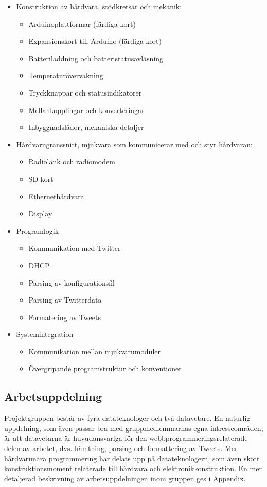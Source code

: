\documentclass[a4paper,11pt]{article}
\begin{document}
	\begin{itemize}
	\item Konstruktion av hårdvara, stödkretsar och mekanik:
		\begin{itemize}
        	\item Arduinoplattformar (färdiga kort)
        	\item Expansionskort till Arduino (färdiga kort)
        	\item Batteriladdning och batteristatusavläsning
        	\item Temperaturövervakning
        	\item Tryckknappar och statusindikatorer
        	\item Mellankopplingar och konverteringar
        	\item Inbyggnadslådor, mekaniska detaljer
        	\end{itemize}	
    	\item Hårdvarugränssnitt, mjukvara som kommunicerar med och styr hårdvaran:
    		\begin{itemize}
        	\item Radiolänk och radiomodem
        	\item SD-kort
        	\item Ethernethårdvara
        	\item Display
        	\end{itemize}
    	\item Programlogik
    		\begin{itemize}
        	\item Kommunikation med Twitter
        	\item DHCP
        	\item Parsing av konfigurationsfil
        	\item Parsing av Twitterdata
        	\item Formatering av Tweets
        	\end{itemize}
    	\item Systemintegration
    		\begin{itemize}
        	\item Kommunikation mellan mjukvarumoduler
        	\item Övergripande programstruktur och konventioner
        	\end{itemize}
	\end{itemize}	

\subsection{Arbetsuppdelning}
Projektgruppen består av fyra datateknologer och två datavetare. En naturlig uppdelning, som även passar bra med gruppmedlemmarnas egna intresseområden, är att datavetarna är huvudansvariga för den webbprogrammeringsrelaterade delen av arbetet, dvs. hämtning, parsing och formattering av Tweets. Mer hårdvarunära programmering har delats upp på datateknologern, som även skött konstruktionsmoment relaterade till hårdvara och elektronikkonstruktion. En mer detaljerad beskrivning av arbetsuppdelningen inom gruppen ges i Appendix.
\end{document}
